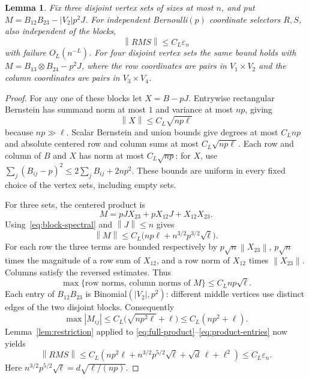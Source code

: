 \documentclass[11pt]{article}
\newtheorem{lemma}[theorem]{Lemma}
\theoremstyle{remark}
\newcommand{\norm}[1]{\left\lVert#1\right\rVert}
\begin{document}
\begin{lemma}\label{lem:blocks}
Fix three disjoint vertex sets of sizes at most $n$, and put
$M=B_{12}B_{23}-|V_2|p^2J$. For independent Bernoulli$(p)$ coordinate
selectors $R,S$, also independent of the blocks,
\begin{equation}\label{eq:product-bound}
 \norm{RMS}\leq C_L\varepsilon_n
\end{equation}
with failure $O_L(n^{-L})$.
For four disjoint vertex sets the same bound holds with
$M=B_{13}\otimes B_{24}-p^2J$, where the row coordinates are pairs
in $V_1\times V_2$ and the column coordinates are pairs in
$V_3\times V_4$.
\end{lemma}
\begin{proof}
For any one of these blocks let $X=B-pJ$. Entrywise rectangular
Bernstein has summand norm at most $1$ and variance at most $np$, giving
\begin{equation}\label{eq:block-spectral}
 \norm X\leq C_L\sqrt{np\ell}
\end{equation}
because $np\gg\ell$. Scalar Bernstein and union bounds give degrees at
most $C_Lnp$ and absolute centered row and column sums at most
$C_L\sqrt{np\ell}$. Each row and column of $B$ and $X$ has norm at most
$C_L\sqrt{np}$: for $X$, use
$\sum_j(B_{ij}-p)^2\leq2\sum_jB_{ij}+2np^2$.
These bounds are uniform in every fixed choice of the vertex sets,
including empty sets.

For three sets, the centered product is
\[
 M=pJX_{23}+pX_{12}J+X_{12}X_{23}.
\]
Using~\eqref{eq:block-spectral} and $\norm J\leq n$ gives
\begin{equation}\label{eq:full-product}
 \norm M\leq C_L\bigl(np\ell+n^{3/2}p^{3/2}\sqrt\ell\bigr).
\end{equation}
For each row the three terms are bounded respectively by
$p\sqrt n\norm{X_{23}}$, $p\sqrt n$ times the magnitude of a row
sum of $X_{12}$, and a row norm of $X_{12}$ times
$\norm{X_{23}}$. Columns satisfy the reversed estimates. Thus
\begin{equation}\label{eq:product-rows}
 \max\{\text{row norms, column norms of }M\}
       \leq C_Lnp\sqrt\ell.
\end{equation}
Each entry of $B_{12}B_{23}$ is Binomial$(|V_2|,p^2)$: different middle
vertices use distinct edges of the two disjoint blocks. Consequently
\begin{equation}\label{eq:product-entries}
 \max|M_{ij}|\leq C_L\bigl(\sqrt{np^2\ell}+\ell\bigr)
                   \leq C_L(np^2+\ell).
\end{equation}
Lemma~\ref{lem:restriction} applied to
\eqref{eq:full-product}--\eqref{eq:product-entries} now yields
\[
 \norm{RMS}\leq C_L\left(
 np^2\ell+n^{3/2}p^{5/2}\sqrt\ell+\sqrt d\,\ell+\ell^2\right)
 \leq C_L\varepsilon_n.
\]
Here $n^{3/2}p^{5/2}\sqrt\ell=d\sqrt{\ell/(np)}$.


\end{proof}
\end{document}
